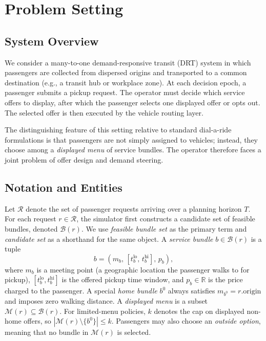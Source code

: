 \section{Problem Setting}

\subsection{System Overview}

We consider a many-to-one demand-responsive transit (DRT) system in which passengers are collected from dispersed origins and transported to a common destination (e.g., a transit hub or workplace zone). At each decision epoch, a passenger submits a pickup request. The operator must decide which service offers to display, after which the passenger selects one displayed offer or opts out. The selected offer is then executed by the vehicle routing layer.

The distinguishing feature of this setting relative to standard dial-a-ride formulations \citep{cordeau2007dial} is that passengers are not simply assigned to vehicles; instead, they choose among a \emph{displayed menu} of service bundles. The operator therefore faces a joint problem of offer design and demand steering.

\subsection{Notation and Entities}
\label{sec:notation_entities}

Let $\mathcal{R}$ denote the set of passenger requests arriving over a planning horizon $T$. For each request $r \in \mathcal{R}$, the simulator first constructs a candidate set of feasible bundles, denoted $\mathcal{B}(r)$. We use \emph{feasible bundle set} as the primary term and \emph{candidate set} as a shorthand for the same object. A \emph{service bundle} $b \in \mathcal{B}(r)$ is a tuple
\[
  b = (m_b,\, [t_b^{\text{lo}},\, t_b^{\text{hi}}],\, p_b),
\]
where $m_b$ is a meeting point (a geographic location the passenger walks to for pickup), $[t_b^{\text{lo}}, t_b^{\text{hi}}]$ is the offered pickup time window, and $p_b \in \mathbb{R}$ is the price charged to the passenger. A special \emph{home bundle} $b^0$ always satisfies $m_{b^0} = r.\text{origin}$ and imposes zero walking distance. A \emph{displayed menu} is a subset $\mathcal{M}(r) \subseteq \mathcal{B}(r)$. For limited-menu policies, $k$ denotes the cap on displayed non-home offers, so $|\mathcal{M}(r) \setminus \{b^0\}| \leq k$. Passengers may also choose an \emph{outside option}, meaning that no bundle in $\mathcal{M}(r)$ is selected.

